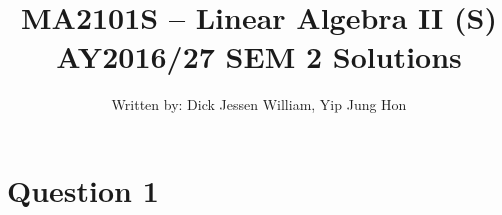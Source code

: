 \documentclass[12pt,a4paper]{article}
\author{Written by: Dick Jessen William, Yip Jung Hon}
\title{MA2101S -- Linear Algebra II (S) \\ AY2016/27 SEM 2 Solutions}
\begin{document}
	
	\maketitle
	
	\section*{Question 1}
	
\end{document}
